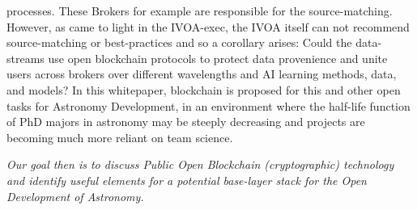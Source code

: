 \documentclass[final,5p,times,twocolumn,authoryear]{elsarticle}
\begin{document}
processes. These Brokers for example are responsible for the source-matching. However, as came to light in the IVOA-exec, the IVOA itself can not recommend source-matching  or best-practices and so a corollary arises: Could the data-streams use open blockchain protocols to protect data provenience and unite users across brokers over different wavelengths and AI learning methods, data, and models? In this whitepaper, blockchain is proposed for this and other open tasks for Astronomy Development, in an environment where the half-life function of PhD majors in astronomy may be steeply decreasing and projects are becoming much more reliant on team science.

\emph{Our goal then is to discuss Public Open Blockchain (cryptographic) technology and identify useful elements for a potential base-layer stack for the Open Development of Astronomy.}
\end{document}
